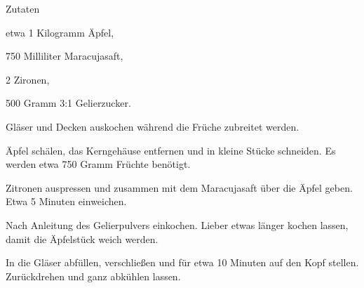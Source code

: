 \startsection[title={Apfel/Maracuja/Zimt-Marmelade},reference=amazimarmelade]

\startitemize
\item Zutaten
      \startitemize
      \item etwa 1 Kilogramm Äpfel,
      \item 750 Milliliter Maracujasaft,
      \item 2 Zironen,
      \item 500 Gramm 3:1 Gelierzucker.
      \stopitemize

\item Gläser und Decken auskochen während die Früche zubreitet werden.
\item Äpfel schälen, das Kerngehäuse entfernen und in kleine Stücke
      schneiden. Es werden etwa 750 Gramm Früchte benötigt.
\item Zitronen auspressen und zusammen mit dem Maracujasaft über die
      Äpfel geben. Etwa 5 Minuten einweichen.
\item Nach Anleitung des Gelierpulvers einkochen. Lieber etwas länger
      kochen lassen, damit die Äpfelstück weich werden.
\item In die Gläser abfüllen, verschließen und für etwa 10 Minuten
      auf den Kopf stellen. Zurückdrehen und ganz abkühlen lassen.
\stopitemize

\stopsection
